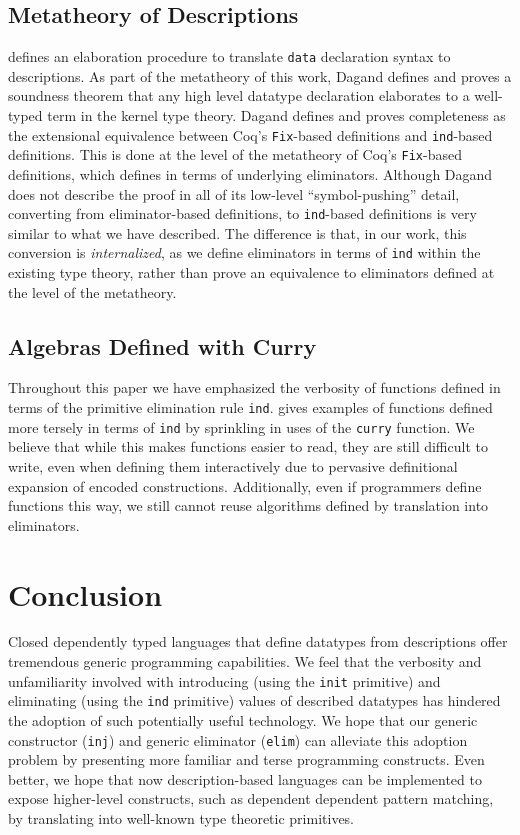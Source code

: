 \documentclass[preprint,nonatbib]{sigplanconf}
\begin{document}
\subsection{Metatheory of Descriptions}

\citet{dagand:phd} defines an elaboration procedure to translate
{\tt data} declaration syntax to descriptions. As part of the
metatheory of this work, Dagand defines and proves a soundness theorem
that any high level datatype declaration elaborates to a well-typed
term in the kernel type theory. Dagand defines and proves completeness as the
extensional equivalence between {\sc Coq}'s {\tt Fix}-based
definitions and {\tt ind}-based definitions. This is done at the level
of the metatheory of {\sc Coq}'s {\tt Fix}-based definitions, which
\citet{gimenez1995codifying} defines in terms of underlying
eliminators. Although Dagand does not describe the proof in all of its
low-level ``symbol-pushing'' detail, converting from
eliminator-based definitions, to {\tt ind}-based definitions is very similar
to what we have described. The difference is that, in our work, this
conversion is {\it internalized}, as we define eliminators in terms of
{\tt ind} within the existing type theory, rather than prove an
equivalence to eliminators defined at the level of the metatheory.

\subsection{Algebras Defined with Curry}

Throughout this paper we have emphasized the verbosity of functions
defined in terms of the primitive elimination rule {\tt ind}.
\citet{mcbride2010ornamental} gives examples of functions defined more
tersely in terms of {\tt ind} by sprinkling in uses of the {\tt curry}
function. We believe that while this makes functions easier to
read, they are still difficult to write, even when defining them
interactively due to pervasive definitional expansion of encoded
constructions. Additionally, even if programmers define functions this
way, we still cannot reuse algorithms defined by translation into
eliminators.

\section{Conclusion}
\label{sec:conclusion}

Closed dependently typed languages that define datatypes from
descriptions offer tremendous generic programming capabilities. 
We feel that the verbosity and unfamiliarity involved with 
introducing (using the {\tt init} primitive)
and eliminating (using the {\tt ind} primitive)
values of described datatypes has hindered the adoption of such
potentially useful technology. We hope that our generic
constructor ({\tt inj}) and generic eliminator ({\tt elim}) can
alleviate this adoption problem by presenting more familiar and terse
programming constructs. Even better, we hope that now description-based
languages can be implemented to expose higher-level
constructs, such as dependent dependent pattern matching, by
translating into well-known type theoretic primitives.
\end{document}
